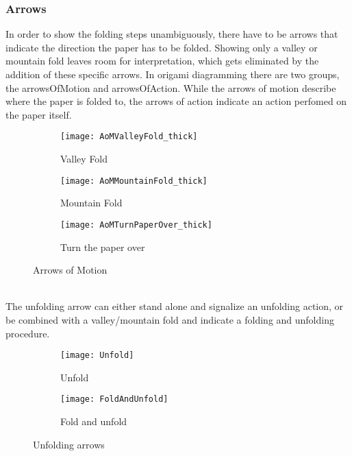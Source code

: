 \subsubsection{Arrows}
\label{sec:arrows}

In order to show the folding steps unambiguously, there have to be arrows that indicate the direction the paper has to be folded. Showing only a valley or mountain fold leaves room for interpretation, which gets eliminated by the addition of these specific arrows. In origami diagramming there are two groups, the \gls{arrowsOfMotion} and \gls{arrowsOfAction}.
While the arrows of motion describe where the paper is folded to, the arrows of action indicate an action perfomed on the paper itself.
\begin{figure*}[h]
    \centering
    \begin{subfigure}[b]{0.3\textwidth}
        \texttt{[image: AoMValleyFold\_thick]}
        \caption{Valley Fold}
        \label{fig:aomValleyFold}
    \end{subfigure}
    \begin{subfigure}[b]{0.3\textwidth}
        \texttt{[image: AoMMountainFold\_thick]}
        \caption{Mountain Fold}
        \label{fig:aomMountainFold}
    \end{subfigure}
    \begin{subfigure}[b]{0.3\textwidth}
        \texttt{[image: AoMTurnPaperOver\_thick]}
        \caption{Turn the paper over}
        \label{fig:aomTurnPaperOver}
    \end{subfigure}
    \caption{Arrows of Motion}
    \label{fig:arrowsOfMotion}
\end{figure*}
\\
The unfolding arrow can either stand alone and signalize an unfolding action, or be combined with a valley/mountain fold and indicate a folding and unfolding procedure.
\begin{figure*}[h]
	\centering
	\begin{subfigure}[b]{0.4\textwidth}
		\texttt{[image: Unfold]}
		\caption{Unfold}
		\label{fig:unfold}
	\end{subfigure}
	\begin{subfigure}[b]{0.3\textwidth}
		\texttt{[image: FoldAndUnfold]}
		\caption{Fold and unfold}
		\label{fig:foldAndUnfold}
	\end{subfigure}
	\caption{Unfolding arrows}
	\label{fig:unfoldingArrows}
\end{figure*}
